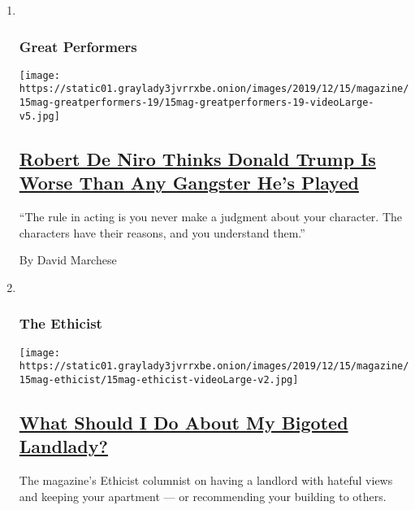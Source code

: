 \begin{enumerate}
\def\labelenumi{\arabic{enumi}.}
\item ~
  \hypertarget{great-performers-4}{%
  \subsubsection{Great Performers}\label{great-performers-4}}

  \texttt{[image: https://static01.graylady3jvrrxbe.onion/images/2019/12/15/magazine/15mag-greatperformers-19/15mag-greatperformers-19-videoLarge-v5.jpg]}

  \hypertarget{robert-de-niro-thinks-donald-trump-is-worse-than-any-gangster-hes-played}{%
  \subsection{\texorpdfstring{\href{/interactive/2019/12/09/magazine/robert-deniro-interview.html}{Robert
  De Niro Thinks Donald Trump Is Worse Than Any Gangster He's
  Played}}{Robert De Niro Thinks Donald Trump Is Worse Than Any Gangster He's Played}}\label{robert-de-niro-thinks-donald-trump-is-worse-than-any-gangster-hes-played}}

  ``The rule in acting is you never make a judgment about your
  character. The characters have their reasons, and you understand
  them.''

  By David Marchese
\item ~
  \hypertarget{the-ethicist}{%
  \subsubsection{The Ethicist}\label{the-ethicist}}

  \texttt{[image: https://static01.graylady3jvrrxbe.onion/images/2019/12/15/magazine/15mag-ethicist/15mag-ethicist-videoLarge-v2.jpg]}

  \hypertarget{what-should-i-do-about-my-bigoted-landlady}{%
  \subsection{\texorpdfstring{\href{/2019/12/11/magazine/what-should-i-do-about-my-bigoted-landlady.html}{What
  Should I Do About My Bigoted
  Landlady?}}{What Should I Do About My Bigoted Landlady?}}\label{what-should-i-do-about-my-bigoted-landlady}}

  The magazine's Ethicist columnist on having a landlord with hateful
  views and keeping your apartment --- or recommending your building to
  others.


\end{enumerate}
